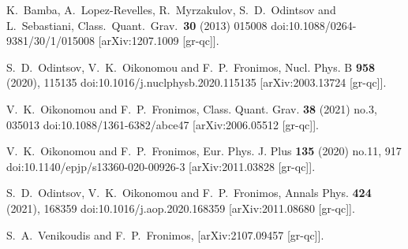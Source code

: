 \documentclass[aps,prd,twocolumn,groupedaddress,showpacs,nofootinbib,amssymb]{revtex4-2}
\begin{document}
\begin{thebibliography}{99}
K.~Bamba, A.~Lopez-Revelles, R.~Myrzakulov, S.~D.~Odintsov and
L.~Sebastiani,
Class.\ Quant.\ Grav.\  {\bf 30} (2013) 015008
doi:10.1088/0264-9381/30/1/015008 [arXiv:1207.1009 [gr-qc]].






















S.~D.~Odintsov, V.~K.~Oikonomou and F.~P.~Fronimos,
Nucl. Phys. B \textbf{958} (2020), 115135
doi:10.1016/j.nuclphysb.2020.115135
[arXiv:2003.13724 [gr-qc]].

V.~K.~Oikonomou and F.~P.~Fronimos,
Class. Quant. Grav. \textbf{38} (2021) no.3, 035013
doi:10.1088/1361-6382/abce47
[arXiv:2006.05512 [gr-qc]].

V.~K.~Oikonomou and F.~P.~Fronimos,
Eur. Phys. J. Plus \textbf{135} (2020) no.11, 917
doi:10.1140/epjp/s13360-020-00926-3
[arXiv:2011.03828 [gr-qc]].

S.~D.~Odintsov, V.~K.~Oikonomou and F.~P.~Fronimos,
Annals Phys. \textbf{424} (2021), 168359
doi:10.1016/j.aop.2020.168359
[arXiv:2011.08680 [gr-qc]].

S.~A.~Venikoudis and F.~P.~Fronimos,
[arXiv:2107.09457 [gr-qc]].


\end{thebibliography}
\end{document}
